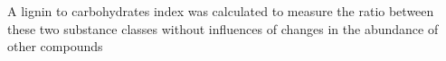 \documentclass[authoryear,preprint,review,12pt]{elsarticle}
\begin{document}
                                                                                                                                                                                                                                                                                                                                                                                                                                                                                                                                                                                                                                                                                                                                                                                                                                                                                                                                                                                                                                                                                                                              A lignin to carbohydrates index was calculated to measure the ratio between these two substance classes without influences of changes in the abundance of other compounds
\end{document}
